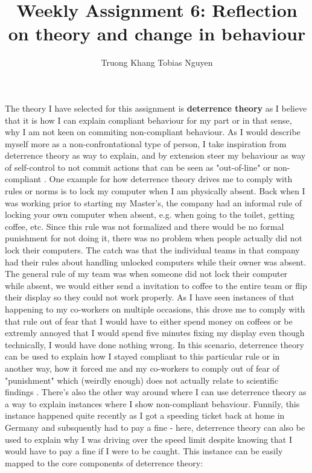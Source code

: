 \documentclass[12pt]{article}
\title{Weekly Assignment 6: Reflection on theory and change in behaviour}
\author{Truong Khang Tobias Nguyen}
\date{}
\begin{document}
\maketitle

The theory I have selected for this assignment is \textbf{deterrence theory} as I believe that it is how I can explain compliant behaviour for my part or in that sense, why I am not keen on commiting non-compliant behaviour. As I would describe myself more as a non-confrontational type of person, I take inspiration from deterrence theory as way to explain, and by extension steer my behaviour as way of self-control to not commit actions that can be seen as "out-of-line" or non-compliant \cite{hirtenlehner2014effect}. One example for how deterrence theory drives me to comply with rules or norms is to lock my computer when I am physically absent. Back when I was working prior to starting my Master's, the company had an informal rule of locking your own computer when absent, e.g. when going to the toilet, getting coffee, etc. Since this rule was not formalized and there would be no formal punishment for not doing it, there was no problem when people actually did not lock their computers. The catch was that the individual teams in that company had their rules about handling unlocked computers while their owner was absent. The general rule of my team was when someone did not lock their computer while absent, we would either send a invitation to coffee to the entire team or flip their display so they could not work properly. 
\newline 
As I have seen instances of that happening to my co-workers on multiple occasions, this drove me to comply with that rule out of fear that I would have to either spend money on coffees or be extremly annoyed that I would spend five minutes fixing my display even though technically, I would have done nothing wrong. In this scenario, deterrence theory can be used to explain how I stayed compliant to this particular rule or in another way, how it forced me and my co-workers to comply out of fear of "punishment" which (weirdly enough) does not actually relate to scientific findings \cite{abed2016understanding}. There's also the other way around where I can use deterrence theory as a way to explain instances where I show non-compliant behaviour. Funnily, this instance happened quite recently as I got a speeding ticket  back at home in Germany and subsquently had to pay a fine - here, deterrence theory can also be used to explain why I was driving over the speed limit despite knowing that I would have to pay a fine if I were to be caught. This instance can be easily mapped to the core components of deterrence theory:
\end{document}
